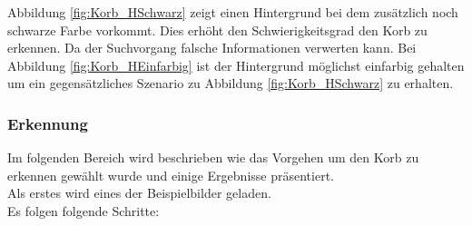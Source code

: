 Abbildung \ref{fig:Korb_HSchwarz} zeigt einen Hintergrund bei dem zusätzlich 
noch schwarze Farbe vorkommt. Dies erhöht den Schwierigkeitsgrad  den Korb zu 
erkennen. Da der Suchvorgang falsche Informationen verwerten kann. Bei 
Abbildung \ref{fig:Korb_HEinfarbig} ist der Hintergrund möglichst einfarbig 
gehalten um ein gegensätzliches Szenario zu Abbildung \ref{fig:Korb_HSchwarz} 
zu erhalten.

\subsubsection{Erkennung}
Im folgenden Bereich wird beschrieben wie das Vorgehen um den Korb zu erkennen 
gewählt wurde und einige Ergebnisse präsentiert.\\
%
Als erstes wird eines der Beispielbilder geladen.\\
%
Es folgen folgende Schritte:\\
%
